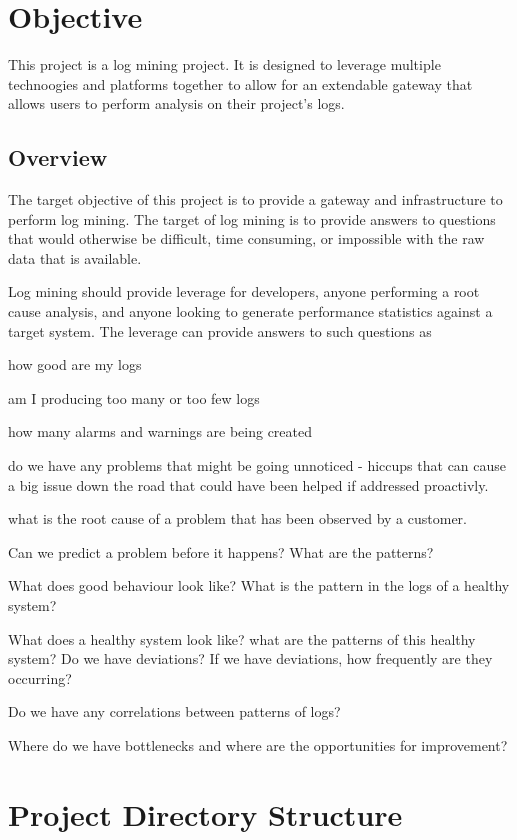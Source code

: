 \documentclass{article}
\begin{document}
\tableofcontents
\newpage

\section{Objective}

This project is a log mining project. It is designed to leverage multiple technoogies and platforms together to allow for an extendable gateway that allows users to perform analysis on their project's logs.

\subsection{Overview}
The target objective of this project is to provide a gateway and infrastructure to perform log mining. The target of log mining is to provide answers to questions that would otherwise be difficult, time consuming, or impossible with the raw data that is available. 

Log mining should provide leverage for developers, anyone performing a root cause analysis, and anyone looking to generate performance statistics against a target system. The leverage can provide answers to such questions as 

how good are my logs

am I producing too many or too few logs

how many alarms and warnings are being created

do we have any problems that might be going unnoticed - hiccups that can cause a big issue down the road that could have been helped if addressed proactivly.

what is the root cause of a problem that has been observed by a customer.

Can we predict a problem before it happens? What are the patterns?

What does good behaviour look like? What is the pattern in the logs of a healthy system?

What does a healthy system look like? what are the patterns of this healthy system? Do we have deviations? If we have deviations, how frequently are they occurring? 

Do we have any correlations between patterns of logs? 

Where do we have bottlenecks and where are the opportunities for improvement?



\section{Project Directory Structure}
 
\end{document}
